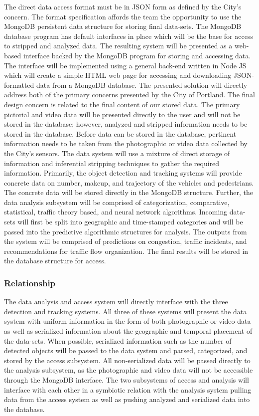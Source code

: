 The direct data access format must be in JSON form as defined by the City's concern. The format specification affords the team the opportunity to use the MongoDB persistent data structure for storing final data-sets. The MongoDB database program has default interfaces in place which will be the base for access to stripped and analyzed data. The resulting system will be presented as a web-based interface backed by the MongoDB program for storing and accessing data. The interface will be implemented using a general back-end written in Node JS which will create a simple HTML web page for accessing and downloading JSON-formatted data from a MongoDB database. The presented solution will directly address both of the primary concerns presented by the City of Portland. The final design concern is related to the final content of our stored data. The primary pictorial and video data will be presented directly to the user and will not be stored in the database; however, analyzed and stripped information needs to be stored in the database. Before data can be stored in the database, pertinent information needs to be taken from the photographic or video data collected by the City's sensors. The data system will use a mixture of direct storage of information and inferential stripping techniques to gather the required information. Primarily, the object detection and tracking systems will provide concrete data on number, makeup, and trajectory of the vehicles and pedestrians. The concrete data will be stored directly in the MongoDB structure. Further, the data analysis subsystem will be comprised of categorization, comparative, statistical, traffic theory based, and neural network algorithms. Incoming data-sets will first be split into geographic and time-stamped categories and will be passed into the predictive algorithmic structures for analysis. The outputs from the system will be comprised of predictions on congestion, traffic incidents, and recommendations for traffic flow organization. The final results will be stored in the database structure for access. 

\subsubsection{Relationship}

The data analysis and access system will directly interface with the three detection and tracking systems. All three of these systems will present the data system with uniform information in the form of both photographic or video data as well as serialized information about the geographic and temporal placement of the data-sets. When possible, serialized information such as the number of detected objects will be passed to the data system and parsed, categorized, and stored by the access subsystem. All non-serialized data will be passed directly to the analysis subsystem, as the photographic and video data will not be accessible through the MongoDB interface. The two subsystems of access and analysis will interface with each other in a symbiotic relation with the analysis system pulling data from the access system as well as pushing analyzed and serialized data into the database. 

